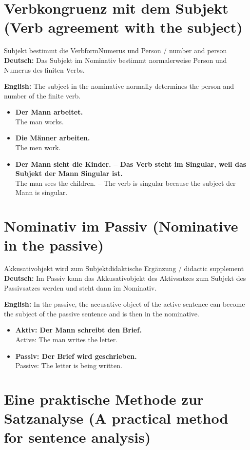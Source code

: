 \documentclass[a4paper,11pt]{article}
\newcommand{\GermanText}[1]{\textbf{Deutsch: }#1\par}
\newcommand{\EnglishText}[1]{{\small\color{SoftGray}\textbf{English: }#1\par}}
\newcommand{\ExampleItem}[2]{\item \textbf{#1}\\{\small\color{SoftGray}#2}}
\begin{document}
\section{Verbkongruenz mit dem Subjekt \textnormal{(Verb agreement with the subject)}}

\begin{grammarentry}{Subjekt bestimmt die Verbform}{Numerus und Person / number and person}
\GermanText{Das Subjekt im Nominativ bestimmt normalerweise Person und Numerus des finiten Verbs.}
\EnglishText{The subject in the nominative normally determines the person and number of the finite verb.}
\end{grammarentry}

\begin{exbox}
\begin{itemize}
\ExampleItem{Der Mann arbeitet.}{The man works.}
\ExampleItem{Die Männer arbeiten.}{The men work.}
\ExampleItem{Der Mann sieht die Kinder. -- Das Verb steht im Singular, weil das Subjekt der Mann Singular ist.}{The man sees the children. -- The verb is singular because the subject der Mann is singular.}
\end{itemize}
\end{exbox}

\section{Nominativ im Passiv \textnormal{(Nominative in the passive)}}

\begin{grammarentry}{Akkusativobjekt wird zum Subjekt}{didaktische Ergänzung / didactic supplement}
\GermanText{Im Passiv kann das Akkusativobjekt des Aktivsatzes zum Subjekt des Passivsatzes werden und steht dann im Nominativ.}
\EnglishText{In the passive, the accusative object of the active sentence can become the subject of the passive sentence and is then in the nominative.}
\end{grammarentry}

\begin{exbox}
\begin{itemize}
\ExampleItem{Aktiv: Der Mann schreibt den Brief.}{Active: The man writes the letter.}
\ExampleItem{Passiv: Der Brief wird geschrieben.}{Passive: The letter is being written.}
\end{itemize}
\end{exbox}

\section{Eine praktische Methode zur Satzanalyse \textnormal{(A practical method for sentence analysis)}}
\end{document}
